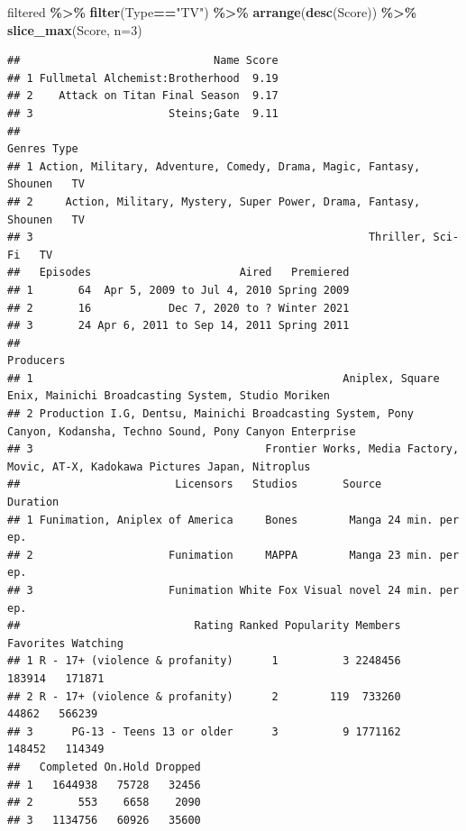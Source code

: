 \documentclass[
]{article}
\newenvironment{Shaded}{\begin{snugshade}}{\end{snugshade}}
\newcommand{\AttributeTok}[1]{\textcolor[rgb]{0.13,0.29,0.53}{#1}}
\newcommand{\DecValTok}[1]{\textcolor[rgb]{0.00,0.00,0.81}{#1}}
\newcommand{\FunctionTok}[1]{\textcolor[rgb]{0.13,0.29,0.53}{\textbf{#1}}}
\newcommand{\NormalTok}[1]{#1}
\newcommand{\SpecialCharTok}[1]{\textcolor[rgb]{0.81,0.36,0.00}{\textbf{#1}}}
\newcommand{\StringTok}[1]{\textcolor[rgb]{0.31,0.60,0.02}{#1}}
\begin{document}
\begin{Shaded}
\begin{Highlighting}[]
\NormalTok{filtered }\SpecialCharTok{\%\textgreater{}\%}
  \FunctionTok{filter}\NormalTok{(Type}\SpecialCharTok{==}\StringTok{"TV"}\NormalTok{) }\SpecialCharTok{\%\textgreater{}\%}
  \FunctionTok{arrange}\NormalTok{(}\FunctionTok{desc}\NormalTok{(Score)) }\SpecialCharTok{\%\textgreater{}\%}
  \FunctionTok{slice\_max}\NormalTok{(Score, }\AttributeTok{n=}\DecValTok{3}\NormalTok{)}
\end{Highlighting}
\end{Shaded}

\begin{verbatim}
##                              Name Score
## 1 Fullmetal Alchemist:Brotherhood  9.19
## 2    Attack on Titan Final Season  9.17
## 3                     Steins;Gate  9.11
##                                                                Genres Type
## 1 Action, Military, Adventure, Comedy, Drama, Magic, Fantasy, Shounen   TV
## 2     Action, Military, Mystery, Super Power, Drama, Fantasy, Shounen   TV
## 3                                                    Thriller, Sci-Fi   TV
##   Episodes                       Aired   Premiered
## 1       64  Apr 5, 2009 to Jul 4, 2010 Spring 2009
## 2       16            Dec 7, 2020 to ? Winter 2021
## 3       24 Apr 6, 2011 to Sep 14, 2011 Spring 2011
##                                                                                                           Producers
## 1                                                Aniplex, Square Enix, Mainichi Broadcasting System, Studio Moriken
## 2 Production I.G, Dentsu, Mainichi Broadcasting System, Pony Canyon, Kodansha, Techno Sound, Pony Canyon Enterprise
## 3                                    Frontier Works, Media Factory, Movic, AT-X, Kadokawa Pictures Japan, Nitroplus
##                        Licensors   Studios       Source        Duration
## 1 Funimation, Aniplex of America     Bones        Manga 24 min. per ep.
## 2                     Funimation     MAPPA        Manga 23 min. per ep.
## 3                     Funimation White Fox Visual novel 24 min. per ep.
##                           Rating Ranked Popularity Members Favorites Watching
## 1 R - 17+ (violence & profanity)      1          3 2248456    183914   171871
## 2 R - 17+ (violence & profanity)      2        119  733260     44862   566239
## 3      PG-13 - Teens 13 or older      3          9 1771162    148452   114349
##   Completed On.Hold Dropped
## 1   1644938   75728   32456
## 2       553    6658    2090
## 3   1134756   60926   35600
\end{verbatim}
\end{document}
